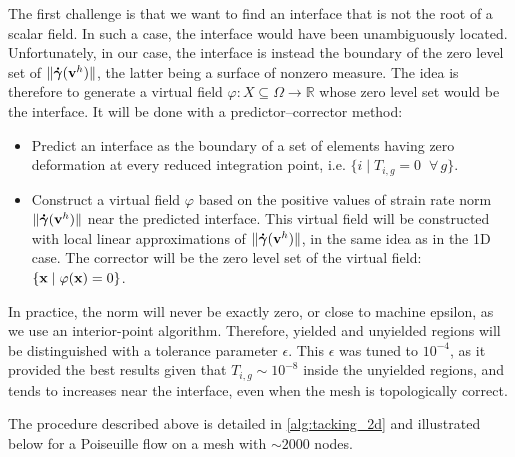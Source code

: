 \documentclass[11 pt]{report}
\begin{document}
The first challenge is that we want to find an interface that is not the root of a scalar field. In such a case, the interface would have been unambiguously located. Unfortunately, in our case, the interface is instead the boundary of the zero level set of $\|\boldsymbol{\dot \gamma}(\mathbf{v}^h)\|$, the latter being a surface of nonzero measure. The idea is therefore to generate a virtual field $\varphi: X \subseteq \Omega \to \mathbb{R}$ whose zero level set would be the interface. It will be done with a predictor–corrector method:
\begin{itemize}
    \item Predict an interface as the boundary of a set of elements having zero deformation at every reduced integration point, i.e. $\{i \;\vert\; T_{i,g} = 0 \;\; \forall\, g\}$.
    \item Construct a virtual field $\varphi$ based on the positive values of strain rate norm $\|\boldsymbol{\dot \gamma}(\mathbf{v}^h)\|$ near the predicted interface. This virtual field will be constructed with local linear approximations of $\|\boldsymbol{\dot \gamma}(\mathbf{v}^h)\|$, in the same idea as in the 1D case. The corrector will be the zero level set of the virtual field: $\{\mathbf{x} \; \vert\; \varphi(\mathbf{x}) = 0\}$.
\end{itemize}

In practice, the norm will never be exactly zero, or close to machine epsilon, as we use an interior-point algorithm. Therefore, yielded and unyielded regions will be distinguished with a tolerance parameter $\epsilon$. This $\epsilon$ was tuned to $10^{-4}$, as it provided the best results given that $T_{i,g} \sim 10^{-8}$ inside the unyielded regions, and tends to increases near the interface, even when the mesh is topologically correct.

The procedure described above is detailed in \cref{alg:tacking_2d} and illustrated below for a Poiseuille flow on a mesh with $\sim 2000$ nodes.
\end{document}
